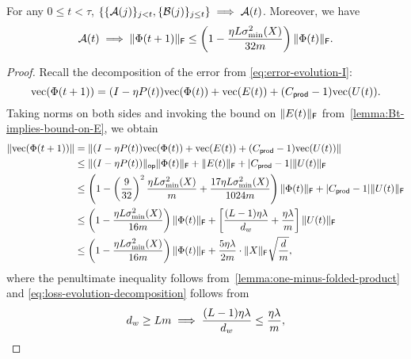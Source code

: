 \begin{lemma}
    \label{lemma:step-i-all-else-implies-A}
    For any $0 \leq t < \tau$, $\{\{\mathcal{A}(j)\}_{j < t}, \{\mathcal{B}(j)\}_{j \leq t}\} \implies \mathcal{A}(t)$. Moreover, we have
    \begin{equation}
        \mathcal{A}(t) \implies
        \lVert\Phi(t+1)\rVert_{\mathsf{F}} \leq
        \left(
        1 - \frac{\eta L \sigma_{\min}^2(X)}{32m}
        \right) \lVert\Phi(t)\rVert_{\mathsf{F}}.
        \label{eq:At-strengthened-step-1}
    \end{equation}
\end{lemma}
\begin{proof}
    Recall the decomposition of the error from \cref{eq:error-evolution-I}:
    \[
        \mathrm{vec}(\Phi(t+1)) = (I - \eta P(t))
        \mathrm{vec}(\Phi(t)) +
        \mathrm{vec}(E(t)) +
        (C_{\mathsf{prod}} - 1) \mathrm{vec}(U(t)).
    \]
    Taking norms on both sides and invoking the
    bound on $\lVert E(t)\rVert_{\mathsf{F}}$ from~\cref{lemma:Bt-implies-bound-on-E}, we obtain
 \begin{align}
      \|\mathrm{vec}(\Phi(t+1))\| &=
      \|(I - \eta P(t)) \mathrm{vec}(\Phi(t)) +
      \mathrm{vec}(E(t)) +
    (C_{\mathsf{prod}} - 1) \mathrm{vec}(U(t))\| \notag \\
                                     &\leq
                                     \lVert(I - \eta P(t))\rVert_{\mathsf{op}} \lVert\Phi(t)\rVert_{\mathsf{F}}
                                     + \lVert E(t)\rVert_{\mathsf{F}} + \lvert C_{\mathsf{prod}} - 1\rvert \lVert U(t)\rVert_{\mathsf{F}} \notag \\
                                     &\leq \left(1 - \left(\frac{9}{32}\right)^2 \frac{\eta L \sigma^2_{\min}(X)}{m} + 
                                     \frac{17 \eta L \sigma^2_{\min}(X)}{1024 m}\right) \lVert\Phi(t)\rVert_{\mathsf{F}}
      + \lvert C_{\mathsf{prod}} - 1\rvert \lVert U(t)\rVert_{\mathsf{F}} \notag \\
      &\leq \left(1 - \frac{\eta L \sigma_{\min}^2(X)}{16m}\right) \lVert\Phi(t)\rVert_{\mathsf{F}}
      + \left[\frac{(L - 1) \eta \lambda}{d_{w}} + \frac{\eta \lambda}{m}\right] \lVert U(t)\rVert_{\mathsf{F}} \notag \\
      &\leq \left(1 - \frac{\eta L \sigma_{\min}^2(X)}{16m}\right) \lVert\Phi(t)\rVert_{\mathsf{F}}
      + \frac{5 \eta \lambda}{2m} \cdot \lVert X\rVert_{\mathsf{F}} \sqrt{\frac{d}{m}},
      \label{eq:loss-evolution-decomposition}
    \end{align}
    where the penultimate inequality follows from~\cref{lemma:one-minus-folded-product} and
    \eqref{eq:loss-evolution-decomposition} follows from
    \[
      d_{w} \geq L m \implies \frac{(L-1) \eta \lambda}{d_w} \leq \frac{\eta \lambda}{m},
\]
\end{proof}
